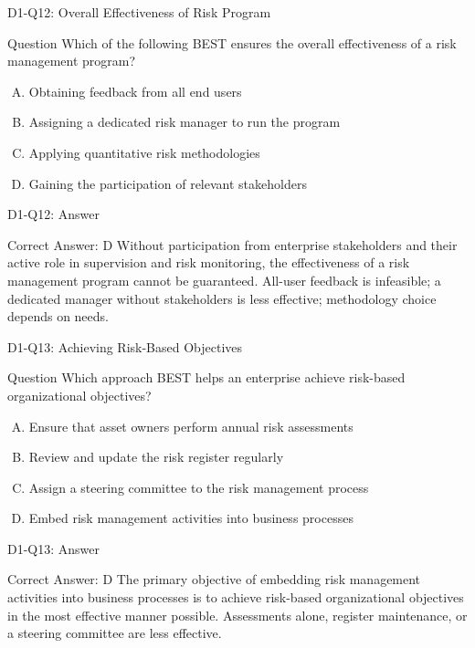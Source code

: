 \documentclass{beamer}
\begin{document}
	\begin{frame}{D1-Q12: Overall Effectiveness of Risk Program}
		\begin{block}{Question}
			Which of the following BEST ensures the overall effectiveness of a risk management program?
		\end{block}
		\begin{enumerate}[(A)]
			\item Obtaining feedback from all end users
			\item Assigning a dedicated risk manager to run the program
			\item Applying quantitative risk methodologies
			\item Gaining the participation of relevant stakeholders
		\end{enumerate}
	\end{frame}
	\begin{frame}{D1-Q12: Answer}
		\begin{block}{Correct Answer: D}
			Without participation from enterprise stakeholders and their active role in supervision and risk monitoring, the effectiveness of a risk management program cannot be guaranteed. All-user feedback is infeasible; a dedicated manager without stakeholders is less effective; methodology choice depends on needs.
		\end{block}
	\end{frame}
	
	\begin{frame}{D1-Q13: Achieving Risk-Based Objectives}
		\begin{block}{Question}
			Which approach BEST helps an enterprise achieve risk-based organizational objectives?
		\end{block}
		\begin{enumerate}[(A)]
			\item Ensure that asset owners perform annual risk assessments
			\item Review and update the risk register regularly
			\item Assign a steering committee to the risk management process
			\item Embed risk management activities into business processes
		\end{enumerate}
	\end{frame}
	\begin{frame}{D1-Q13: Answer}
		\begin{block}{Correct Answer: D}
			The primary objective of embedding risk management activities into business processes is to achieve risk-based organizational objectives in the most effective manner possible. Assessments alone, register maintenance, or a steering committee are less effective.
		\end{block}
	\end{frame}
	
\end{document}
